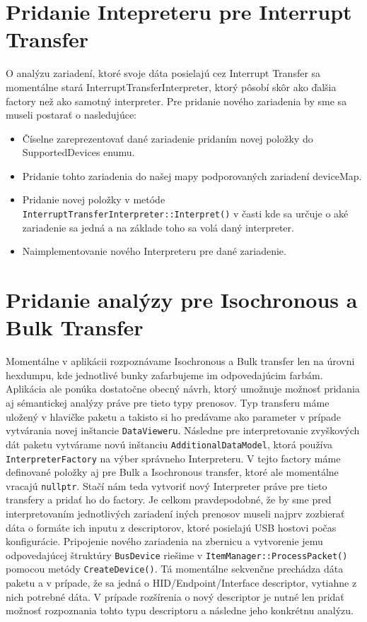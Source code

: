 \section{Pridanie Intepreteru pre Interrupt Transfer}
\label{sec:kap5:prid_interrupt}
O analýzu zariadení, ktoré svoje dáta posielajú cez Interrupt Transfer sa momentálne stará InterruptTransferInterpreter, ktorý pôsobí skôr ako ďalšia factory než ako samotný interpreter. Pre pridanie nového zariadenia by sme sa museli postarať o nasledujúce:
\begin{itemize}
\item Číselne zareprezentovať dané zariadenie pridaním novej položky do SupportedDevices enumu.
\item Pridanie tohto zariadenia do našej mapy podporovaných zariadení deviceMap.
\item Pridanie novej položky v metóde \newline\texttt{InterruptTransferInterpreter::Interpret()} v časti kde sa určuje o aké zariadenie sa jedná a na základe toho sa volá daný interpreter.
\item Naimplementovanie nového Interpreteru pre dané zariadenie.
\end{itemize}
\section{Pridanie analýzy pre Isochronous a Bulk \newline Transfer}
\label{sec:kap5:prid_an_iso_bulk}
Momentálne v aplikácii rozpoznávame Isochronous a Bulk transfer len na úrovni hexdumpu, kde jednotlivé bunky zafarbujeme im odpovedajúcim farbám. Aplikácia ale ponúka dostatočne obecný návrh, ktorý umožnuje možnosť pridania aj sémantickej analýzy práve pre tieto typy prenosov. Typ transferu máme uložený v hlavičke paketu a takisto si ho predávame ako parameter v prípade vytvárania novej inštancie \texttt{DataVieweru}. Následne pre interpretovanie zvyškových dát paketu vytvárame novú inštanciu \texttt{AdditionalDataModel}, ktorá používa \texttt{InterpreterFactory} na výber správneho Interpreteru. V tejto factory máme definované položky aj pre Bulk a Isochronous transfer, ktoré ale momentálne vracajú \texttt{nullptr}. Stačí nám teda vytvoriť nový Interpreter práve pre tieto transfery a pridať ho do factory. Je celkom pravdepodobné, že by sme pred interpretovaním jednotlivých zariadení iných prenosov museli najprv zozbierať dáta o formáte ich inputu z descriptorov, ktoré posielajú USB hostovi počas konfigurácie. Pripojenie nového zariadenia na zbernicu a vytvorenie jemu odpovedajúcej štruktúry \texttt{BusDevice} riešime v \texttt{ItemManager::ProcessPacket()} pomocou metódy \texttt{CreateDevice()}. Tá momentálne sekvenčne prechádza dáta paketu a v prípade, že sa jedná o HID/Endpoint/Interface descriptor, vytiahne z nich potrebné dáta. V prípade rozšírenia o nový descriptor je nutné len pridať možnosť rozpoznania tohto typu descriptoru a následne jeho konkrétnu analýzu.
